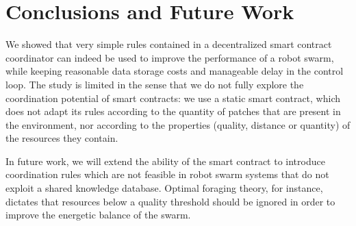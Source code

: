 \documentclass[runningheads]{llncs}
\begin{document}
\section{Conclusions and Future Work}
\label{sec:conclusion}

We showed that very simple rules contained in a decentralized smart contract coordinator can indeed be used to improve the performance of a robot swarm, while keeping reasonable data storage costs and manageable delay in the control loop. The study is limited in the sense that we do not fully explore the coordination potential of smart contracts: we use a static smart contract, which does not adapt its rules according to the quantity of patches that are present in the environment, nor according to the properties (quality, distance or quantity) of the resources they contain.

In future work, we will extend the ability of the smart contract to introduce coordination rules which are not feasible in robot swarm systems that do not exploit a shared knowledge database. Optimal foraging theory, for instance, dictates that resources below a quality threshold should be ignored in order to improve the energetic balance of the swarm. 






\end{document}
